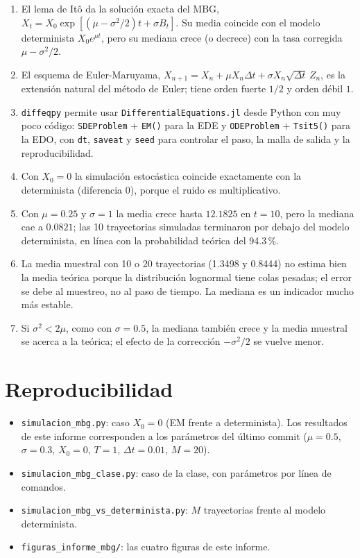 \documentclass[11pt,a4paper]{article}
\begin{document}
\begin{enumerate}
    \item El lema de Itô da la solución exacta del MBG, $X_t = X_0\exp[(\mu - \sigma^2/2)t + \sigma B_t]$. Su media coincide con el modelo determinista $X_0e^{\mu t}$, pero su mediana crece (o decrece) con la tasa corregida $\mu - \sigma^2/2$.
    \item El esquema de Euler-Maruyama, $X_{n+1} = X_n + \mu X_n\Delta t + \sigma X_n\sqrt{\Delta t}\,Z_n$, es la extensión natural del método de Euler; tiene orden fuerte $1/2$ y orden débil $1$.
    \item \texttt{diffeqpy} permite usar \texttt{DifferentialEquations.jl} desde Python con muy poco código: \texttt{SDEProblem} + \texttt{EM()} para la EDE y \texttt{ODEProblem} + \texttt{Tsit5()} para la EDO, con \texttt{dt}, \texttt{saveat} y \texttt{seed} para controlar el paso, la malla de salida y la reproducibilidad.
    \item Con $X_0 = 0$ la simulación estocástica coincide exactamente con la determinista (diferencia $0$), porque el ruido es multiplicativo.
    \item Con $\mu = 0.25$ y $\sigma = 1$ la media crece hasta $12.1825$ en $t = 10$, pero la mediana cae a $0.0821$; las 10 trayectorias simuladas terminaron por debajo del modelo determinista, en línea con la probabilidad teórica del 94.3\,\%.
    \item La media muestral con 10 o 20 trayectorias (1.3498 y 0.8444) no estima bien la media teórica porque la distribución lognormal tiene colas pesadas; el error se debe al muestreo, no al paso de tiempo. La mediana es un indicador mucho más estable.
    \item Si $\sigma^2 < 2\mu$, como con $\sigma = 0.5$, la mediana también crece y la media muestral se acerca a la teórica; el efecto de la corrección $-\sigma^2/2$ se vuelve menor.
\end{enumerate}

\section*{Reproducibilidad}

\begin{itemize}
    \item \texttt{simulacion\_mbg.py}: caso $X_0 = 0$ (EM frente a determinista). Los resultados de este informe corresponden a los parámetros del último commit ($\mu = 0.5$, $\sigma = 0.3$, $X_0 = 0$, $T = 1$, $\Delta t = 0.01$, $M = 20$).
    \item \texttt{simulacion\_mbg\_clase.py}: caso de la clase, con parámetros por línea de comandos.
    \item \texttt{simulacion\_mbg\_vs\_determinista.py}: $M$ trayectorias frente al modelo determinista.
    \item \texttt{figuras\_informe\_mbg/}: las cuatro figuras de este informe.
\end{itemize}
\end{document}
